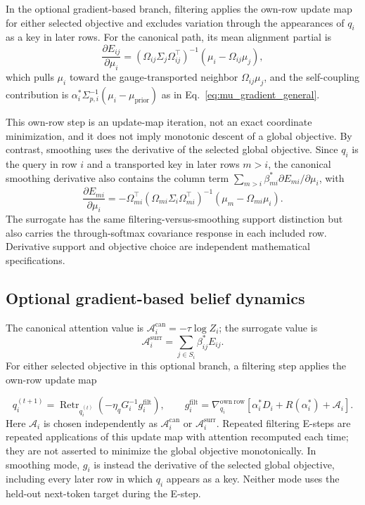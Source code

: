 \documentclass[twoside,11pt]{article}
\begin{document}
In the optional gradient-based branch, filtering applies the own-row update map for either selected objective and excludes variation through the appearances of $q_i$ as a key in later rows. For the canonical path, its mean alignment partial is
\begin{equation}
\frac{\partial E_{ij}}{\partial \mu_i} = \left(\Omega_{ij}\Sigma_j\Omega_{ij}^\top\right)^{-1}\left(\mu_i - \Omega_{ij}\mu_j\right),
\label{eq:queryside_partial}
\end{equation}
which pulls $\mu_i$ toward the gauge-transported neighbor $\Omega_{ij}\mu_j$, and the self-coupling contribution is $\alpha_i^*\Sigma_{p,i}^{-1}(\mu_i-\mu_{\text{prior}})$ as in Eq.~\eqref{eq:mu_gradient_general}.

This own-row step is an update-map iteration, not an exact coordinate minimization, and it does not imply monotonic descent of a global objective. By contrast, smoothing uses the derivative of the selected global objective. Since $q_i$ is the query in row $i$ and a transported key in later rows $m>i$, the canonical smoothing derivative also contains the column term $\sum_{m>i}\beta_{mi}^*\partial E_{mi}/\partial\mu_i$, with
\begin{equation}
\frac{\partial E_{mi}}{\partial \mu_i} = -\Omega_{mi}^\top \left(\Omega_{mi}\Sigma_i\Omega_{mi}^\top\right)^{-1}\left(\mu_m - \Omega_{mi}\mu_i\right).
\label{eq:keyside_partial}
\end{equation}
The surrogate has the same filtering-versus-smoothing support distinction but also carries the through-softmax covariance response in each included row. Derivative support and objective choice are independent mathematical specifications.


\subsection{Optional gradient-based belief dynamics}
\label{sec:supp_belief_dynamics}

The canonical attention value is $\mathcal A_i^{\mathrm{can}}=-\tau\log Z_i$; the surrogate value is
\begin{equation}
\mathcal A_i^{\mathrm{surr}}=\sum_{j\in S_i}\beta_{ij}^*E_{ij}.
\end{equation}
For either selected objective in this optional branch, a filtering step applies the own-row update map

\begin{equation}
q_i^{(t+1)}
=\operatorname{Retr}_{q_i^{(t)}}\left(-\eta_qG_i^{-1}g_i^{\mathrm{filt}}\right),
\qquad
g_i^{\mathrm{filt}}
=\nabla_{q_i}^{\mathrm{own\ row}}
\left[\alpha_i^*D_i+R(\alpha_i^*)+\mathcal{A}_i\right].
\label{eq:belief_dynamics}
\end{equation}
Here $\mathcal{A}_i$ is chosen independently as $\mathcal{A}_i^{\mathrm{can}}$ or $\mathcal{A}_i^{\mathrm{surr}}$. Repeated filtering E-steps are repeated applications of this update map with attention recomputed each time; they are not asserted to minimize the global objective monotonically. In smoothing mode, $g_i$ is instead the derivative of the selected global objective, including every later row in which $q_i$ appears as a key. Neither mode uses the held-out next-token target during the E-step.
\end{document}
